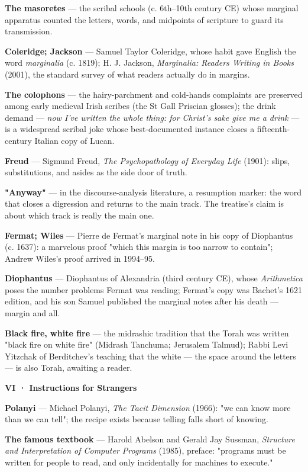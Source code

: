 \documentclass[11pt]{article}
\begin{document}
\textbf{The masoretes} — the scribal schools (c. 6th–10th century CE) whose marginal apparatus counted the letters, words, and midpoints of scripture to guard its transmission.

\textbf{Coleridge; Jackson} — Samuel Taylor Coleridge, whose habit gave English the word \emph{marginalia} (c. 1819); H. J. Jackson, \emph{Marginalia: Readers Writing in Books} (2001), the standard survey of what readers actually do in margins.

\textbf{The colophons} — the hairy-parchment and cold-hands complaints are preserved among early medieval Irish scribes (the St Gall Priscian glosses); the drink demand — \emph{now I've written the whole thing: for Christ's sake give me a drink} — is a widespread scribal joke whose best-documented instance closes a fifteenth-century Italian copy of Lucan.

\textbf{Freud} — Sigmund Freud, \emph{The Psychopathology of Everyday Life} (1901): slips, substitutions, and asides as the side door of truth.

\textbf{"Anyway"} — in the discourse-analysis literature, a resumption marker: the word that closes a digression and returns to the main track. The treatise's claim is about which track is really the main one.

\textbf{Fermat; Wiles} — Pierre de Fermat's marginal note in his copy of Diophantus (c. 1637): a marvelous proof "which this margin is too narrow to contain"; Andrew Wiles's proof arrived in 1994–95.

\textbf{Diophantus} — Diophantus of Alexandria (third century CE), whose \emph{Arithmetica} poses the number problems Fermat was reading; Fermat's copy was Bachet's 1621 edition, and his son Samuel published the marginal notes after his death — margin and all.

\textbf{Black fire, white fire} — the midrashic tradition that the Torah was written "black fire on white fire" (Midrash Tanchuma; Jerusalem Talmud); Rabbi Levi Yitzchak of Berditchev's teaching that the white — the space around the letters — is also Torah, awaiting a reader.

\textbf{VI · Instructions for Strangers}

\textbf{Polanyi} — Michael Polanyi, \emph{The Tacit Dimension} (1966): "we can know more than we can tell"; the recipe exists because telling falls short of knowing.

\textbf{The famous textbook} — Harold Abelson and Gerald Jay Sussman, \emph{Structure and Interpretation of Computer Programs} (1985), preface: "programs must be written for people to read, and only incidentally for machines to execute."
\end{document}

